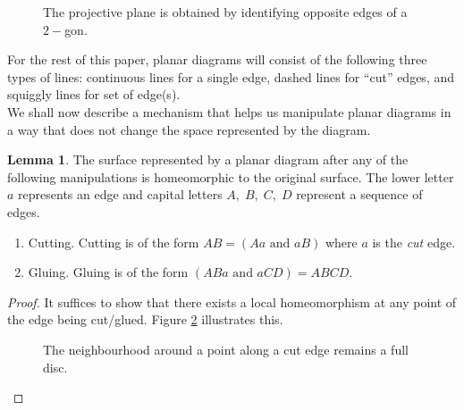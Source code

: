 \documentclass{article}
\theoremstyle{definition}
\newtheorem{lem}[theorem]{Lemma}
\begin{document}
\begin{figure}[htb]
  \centering
  
  \caption{The projective plane is obtained by identifying opposite edges of a $2-$gon.}
  \label{fig:pplane canonical}
\end{figure}
For the rest of this paper, planar diagrams will consist of the following three types of lines: continuous lines for a single edge, dashed lines for ``cut'' edges, and squiggly lines for set of edge(s).\\
We shall now describe a mechanism that helps us manipulate planar diagrams in a way that does not change the space represented by the diagram.\\
\begin{lem}
  The surface represented by a planar diagram after any of the following manipulations is homeomorphic to the original surface. The lower letter $a$ represents an edge and capital letters $A,\;B,\;C,\;D$ represent a sequence of edges.
  \begin{enumerate}[nosep, label = (\arabic*)] 
     \item Cutting. Cutting is of the form $AB = (Aa\text{ and }aB)$ where $a$ is the \emph{cut} edge.
     \item Gluing. Gluing is of the form $(ABa\text{ and }aCD)=ABCD.$
   \end{enumerate} 
\end{lem}
\begin{proof}
  It suffices to show that there exists a local homeomorphism at any point of the edge being cut/glued. Figure \ref{fig:cut glue} illustrates this.
  \begin{figure}[htb]
    \centering
    
    \caption{The neighbourhood around a point along a cut edge remains a full disc.}
    \label{fig:cut glue}
  \end{figure}
\end{proof}
%
\end{document}
